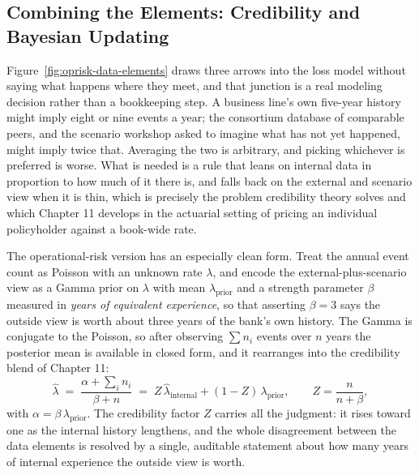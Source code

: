\documentclass[../ai_in_finance]{subfiles}
\begin{document}
\subsection{Combining the Elements: Credibility and Bayesian Updating}
\label{sec:oprisk-credibility}

Figure~\ref{fig:oprisk-data-elements} draws three arrows into the loss model without saying what happens where they meet, and that junction is a real modeling decision rather than a bookkeeping step. A business line's own five-year history might imply eight or nine events a year; the consortium database of comparable peers, and the scenario workshop asked to imagine what has not yet happened, might imply twice that. Averaging the two is arbitrary, and picking whichever is preferred is worse. What is needed is a rule that leans on internal data in proportion to how much of it there is, and falls back on the external and scenario view when it is thin, which is precisely the problem credibility theory solves and which Chapter 11 develops in the actuarial setting of pricing an individual policyholder against a book-wide rate.

The operational-risk version has an especially clean form. Treat the annual event count as Poisson with an unknown rate $\lambda$, and encode the external-plus-scenario view as a Gamma prior on $\lambda$ with mean $\lambda_{\text{prior}}$ and a strength parameter $\beta$ measured in \emph{years of equivalent experience}, so that asserting $\beta=3$ says the outside view is worth about three years of the bank's own history. The Gamma is conjugate to the Poisson, so after observing $\sum n_i$ events over $n$ years the posterior mean is available in closed form, and it rearranges into the credibility blend of Chapter 11:
\begin{equation*}
\hat\lambda \;=\; \frac{\alpha + \sum_i n_i}{\beta + n} \;=\; Z\,\hat\lambda_{\text{internal}} + (1-Z)\,\lambda_{\text{prior}}, \qquad Z = \frac{n}{n+\beta},
\end{equation*}
with $\alpha = \beta\,\lambda_{\text{prior}}$. The credibility factor $Z$ carries all the judgment: it rises toward one as the internal history lengthens, and the whole disagreement between the data elements is resolved by a single, auditable statement about how many years of internal experience the outside view is worth.
\end{document}
